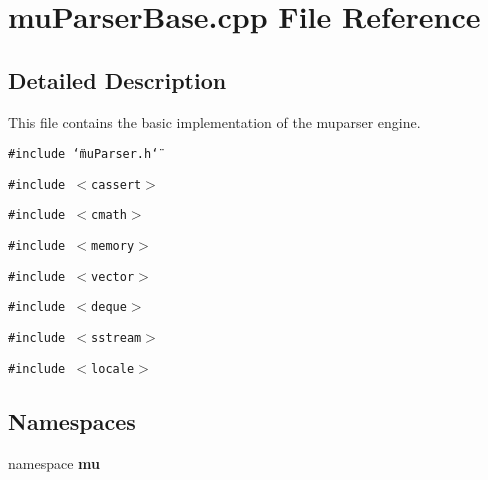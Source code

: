 \section{muParserBase.cpp File Reference}
\label{muParserBase_8cpp}


\subsection{Detailed Description}
This file contains the basic implementation of the muparser engine. 



{\tt \#include \char`\"{}muParser.h\char`\"{}}\par
{\tt \#include $<$cassert$>$}\par
{\tt \#include $<$cmath$>$}\par
{\tt \#include $<$memory$>$}\par
{\tt \#include $<$vector$>$}\par
{\tt \#include $<$deque$>$}\par
{\tt \#include $<$sstream$>$}\par
{\tt \#include $<$locale$>$}\par
\subsection*{Namespaces}
\begin{CompactItemize}
\item 
namespace {\bf mu}
\end{CompactItemize}
